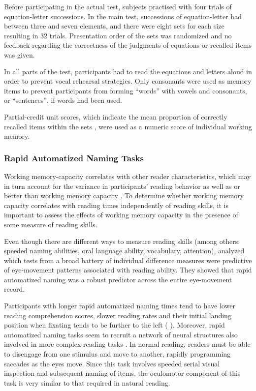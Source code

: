 \documentclass{frontiersSCNS}\usepackage{knitr}
\begin{document}
Before participating in the actual test, subjects practised with four trials of equation-letter successions. In the main test, successions of equation-letter had between three and seven elements, and there were eight sets for each size resulting in 32 trials. Presentation order of the sets was randomized and no feedback regarding the correctness of the judgments of equations or recalled items was given.

In all parts of the test, participants had to read the equations and letters aloud in order to prevent vocal rehearsal strategies. Only consonants were used as memory items to prevent participants from forming ``words'' with vowels and consonants, or ``sentences'', if words had been used.

Partial-credit unit scores, which indicate the mean proportion of correctly recalled items within the sets  \citep{ConwayEtAl2005}, were used as a numeric score of individual working memory.




\subsubsection{Rapid Automatized Naming Tasks}

Working memory-capacity correlates with other reader characteristics, which may in turn account for the variance in participants’ reading behavior as well as or better than working memory capacity \citep{TraxlerEtAl2012}. To determine whether working memory capacity correlates with reading times independently of reading skills, it is important to assess the effects of working memory capacity  in the presence of some measure of reading skills.

Even though there are different ways to measure reading skills (among others: speeded naming abilities, oral language ability, vocabulary, attention), \citet{KupermanVanDyke2011} analyzed which tests from a broad battery of individual difference measures were predictive of eye-movement patterns associated with reading ability. They showed that rapid automatized naming was a robust predictor across the entire eye-movement record.



Participants with longer rapid automatized naming times tend to have lower reading comprehension scores, slower reading rates  and their initial landing position when fixating tends to be further to the left (\citealp[among others:][]{HoweEtAl2006,ArnellEtAl2009,KupermanVanDyke2011}
). Moreover, rapid automatized naming tasks seem to recruit a network of neural structures also involved in more complex reading tasks \citep{MisraEtAl2004}. In normal reading, readers must be able to disengage from one stimulus and move to another, rapidly programming saccades as the eyes move. Since this task involves speeded serial visual inspection and subsequent naming of items, the oculomotor component of this task is very similar to that required in natural reading. 
\end{document}
